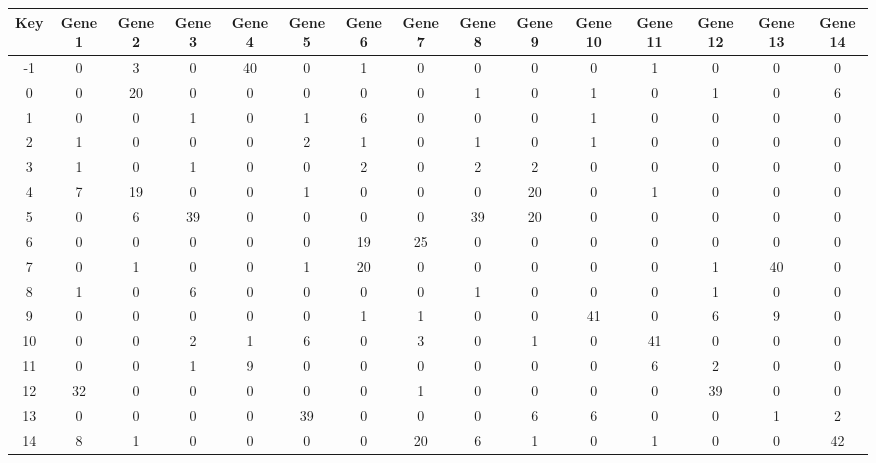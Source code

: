 \begin{tabular}{|c|c|c|c|c|c|c|c|c|c|c|c|c|c|c|}
\hline
Key & Gene 1 & Gene 2 & Gene 3 & Gene 4 & Gene 5 & Gene 6 & Gene 7 & Gene 8 & Gene 9 & Gene 10 & Gene 11 & Gene 12 & Gene 13 & Gene 14 \\
\hline
-1 & 0 & 3 & 0 & 40 & 0 & 1 & 0 & 0 & 0 & 0 & 1 & 0 & 0 & 0 \\
0 & 0 & 20 & 0 & 0 & 0 & 0 & 0 & 1 & 0 & 1 & 0 & 1 & 0 & 6 \\
1 & 0 & 0 & 1 & 0 & 1 & 6 & 0 & 0 & 0 & 1 & 0 & 0 & 0 & 0 \\
2 & 1 & 0 & 0 & 0 & 2 & 1 & 0 & 1 & 0 & 1 & 0 & 0 & 0 & 0 \\
3 & 1 & 0 & 1 & 0 & 0 & 2 & 0 & 2 & 2 & 0 & 0 & 0 & 0 & 0 \\
4 & 7 & 19 & 0 & 0 & 1 & 0 & 0 & 0 & 20 & 0 & 1 & 0 & 0 & 0 \\
5 & 0 & 6 & 39 & 0 & 0 & 0 & 0 & 39 & 20 & 0 & 0 & 0 & 0 & 0 \\
6 & 0 & 0 & 0 & 0 & 0 & 19 & 25 & 0 & 0 & 0 & 0 & 0 & 0 & 0 \\
7 & 0 & 1 & 0 & 0 & 1 & 20 & 0 & 0 & 0 & 0 & 0 & 1 & 40 & 0 \\
8 & 1 & 0 & 6 & 0 & 0 & 0 & 0 & 1 & 0 & 0 & 0 & 1 & 0 & 0 \\
9 & 0 & 0 & 0 & 0 & 0 & 1 & 1 & 0 & 0 & 41 & 0 & 6 & 9 & 0 \\
10 & 0 & 0 & 2 & 1 & 6 & 0 & 3 & 0 & 1 & 0 & 41 & 0 & 0 & 0 \\
11 & 0 & 0 & 1 & 9 & 0 & 0 & 0 & 0 & 0 & 0 & 6 & 2 & 0 & 0 \\
12 & 32 & 0 & 0 & 0 & 0 & 0 & 1 & 0 & 0 & 0 & 0 & 39 & 0 & 0 \\
13 & 0 & 0 & 0 & 0 & 39 & 0 & 0 & 0 & 6 & 6 & 0 & 0 & 1 & 2 \\
14 & 8 & 1 & 0 & 0 & 0 & 0 & 20 & 6 & 1 & 0 & 1 & 0 & 0 & 42 \\
\hline
\end{tabular}